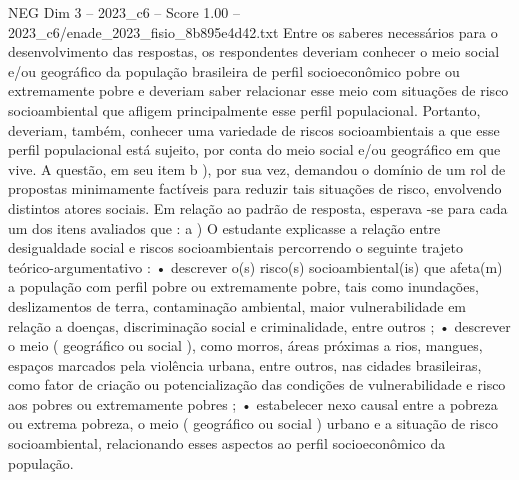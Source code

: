 \begin{textsample}{NEG Dim 3 – 2023\_c6 – Score 1.00 – 2023\_c6/enade\_2023\_fisio\_8b895e4d42.txt}
Entre os saberes necessários para o desenvolvimento das respostas, os respondentes deveriam conhecer o meio social e/ou geográfico da população brasileira de perfil socioeconômico pobre ou extremamente pobre e deveriam saber relacionar esse meio com situações de risco socioambiental que afligem principalmente esse perfil populacional.
Portanto, deveriam, também, conhecer uma variedade de riscos socioambientais a que esse perfil populacional está sujeito, por conta do meio social e/ou geográfico em que vive.
A questão, em seu item b ), por sua vez, demandou o domínio de um rol de propostas minimamente factíveis para reduzir tais situações de risco, envolvendo distintos atores sociais.
Em relação ao padrão de resposta, esperava -se para cada um dos itens avaliados que : a ) O estudante explicasse a relação entre desigualdade social e riscos socioambientais percorrendo o seguinte trajeto teórico-argumentativo : • descrever o(s) risco(s) socioambiental(is) que afeta(m) a população com perfil pobre ou extremamente pobre, tais como inundações, deslizamentos de terra, contaminação ambiental, maior vulnerabilidade em relação a doenças, discriminação social e criminalidade, entre outros ; • descrever o meio ( geográfico ou social ), como morros, áreas próximas a rios, mangues, espaços marcados pela violência urbana, entre outros, nas cidades brasileiras, como fator de criação ou potencialização das condições de vulnerabilidade e risco aos pobres ou extremamente pobres ; • estabelecer nexo causal entre a pobreza ou extrema pobreza, o meio ( geográfico ou social ) urbano e a situação de risco socioambiental, relacionando esses aspectos ao perfil socioeconômico da população.

\end{textsample}

